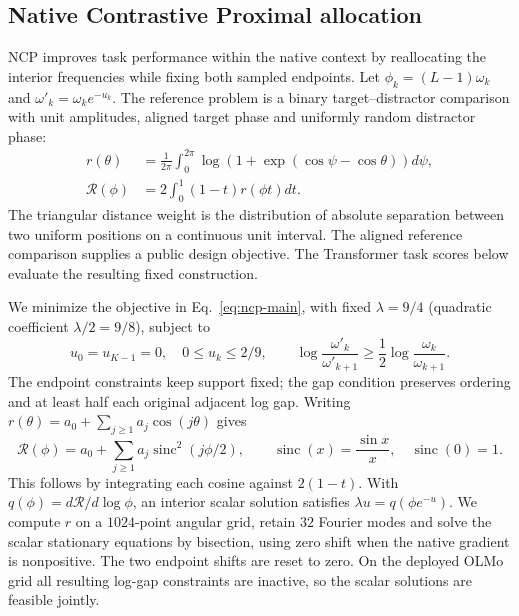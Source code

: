 \subsection{Native Contrastive Proximal allocation}
\label{sec:ncp-construction-new}
NCP improves task performance within the native context by reallocating the
interior frequencies while fixing both sampled endpoints. Let
$\phi_k=(L-1)\omega_k$ and $\omega'_k=\omega_ke^{-u_k}$.
The reference problem is a binary target--distractor comparison with unit
amplitudes, aligned target phase and uniformly random distractor phase:
\begin{align}
r(\theta)&=\frac{1}{2\pi}\int_0^{2\pi}
 \log\!\left(1+\exp(\cos\psi-\cos\theta)\right)d\psi,\\
\mathcal R(\phi)&=2\int_0^1(1-t)r(\phi t)dt.
\label{eq:ncp-reference-risk}
\end{align}
The triangular distance weight is the distribution of absolute separation
between two uniform positions on a continuous unit interval. The aligned
reference comparison supplies a public design objective. The Transformer task
scores below evaluate the resulting fixed construction.

We minimize the objective in Eq.~\eqref{eq:ncp-main}, with fixed
$\lambda=9/4$ (quadratic coefficient $\lambda/2=9/8$), subject to
\begin{equation}
u_0=u_{K-1}=0,\quad 0\le u_k\le 2/9,\qquad
\log\frac{\omega'_k}{\omega'_{k+1}}
 \ge\frac12\log\frac{\omega_k}{\omega_{k+1}}.
\label{eq:ncp-constraints}
\end{equation}
The endpoint constraints keep support fixed; the gap condition preserves
ordering and at least half each original adjacent log gap.
Writing $r(\theta)=a_0+\sum_{j\ge1}a_j\cos(j\theta)$ gives
\begin{equation}
\mathcal R(\phi)=a_0+\sum_{j\ge1}a_j
 \operatorname{sinc}^2(j\phi/2),\qquad
\operatorname{sinc}(x)=\frac{\sin x}{x},\quad\operatorname{sinc}(0)=1.
\label{eq:ncp-fourier}
\end{equation}
This follows by integrating each cosine against $2(1-t)$.
With $q(\phi)=d\mathcal R/d\log\phi$, an interior scalar solution satisfies
$\lambda u=q(\phi e^{-u})$. We compute $r$ on a $1024$-point angular grid,
retain $32$ Fourier modes and solve the scalar stationary equations by
bisection, using zero shift when the native gradient is nonpositive. The two
endpoint shifts are reset to zero. On the deployed OLMo grid all resulting
log-gap constraints are inactive, so the scalar solutions are feasible jointly.

